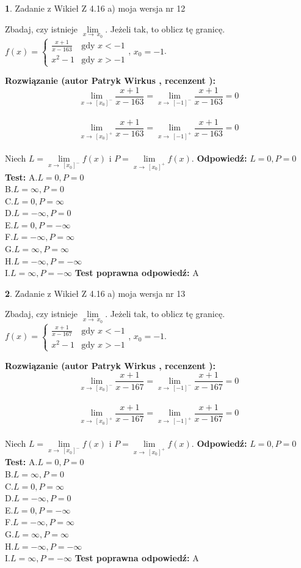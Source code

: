 \documentclass[12pt, a4paper]{article}
\theoremstyle{definition} %
\newtheorem{zad}{}
\newcommand{\zadStart}[1]{\begin{zad}#1\newline}
\newcommand{\zadStop}{\end{zad}}
\newcommand{\rozwStart}[2]{\noindent \textbf{Rozwiązanie (autor #1 , recenzent #2): }\newline}
\newcommand{\rozwStop}{\newline}
\newcommand{\odpStart}{\noindent \textbf{Odpowiedź:}\newline}
\newcommand{\odpStop}{\newline}
\newcommand{\testStart}{\noindent \textbf{Test:}\newline}
\newcommand{\testStop}{\newline}
\newcommand{\kluczStart}{\noindent \textbf{Test poprawna odpowiedź:}\newline}
\newcommand{\kluczStop}{\newline}
\begin{document}
\zadStart{Zadanie z Wikieł Z 4.16 a) moja wersja nr 12}

Zbadaj, czy istnieje $\lim\limits_{x\to\ x_{0}}$. Jeżeli tak, to oblicz tę granicę.\\   $f(x) = \left\{ \begin{array}{ll}
\frac{x+1}{x-163} & \textrm{gdy $x<-1$}\\
x^{2}-1 & \textrm{gdy $x>-1$}
\end{array} \right.$, $x_{0}=-1$.
\zadStop
\rozwStart{Patryk Wirkus}{}
$$\lim\limits_{x\to\ [x_{0}]^{-}}\frac{x+1}{x-163} = \lim\limits_{x\to\ [-1]^{-}}\frac{x+1}{x-163} = 0$$
\\
$$\lim\limits_{x\to\ [x_{0}]^{+}}\frac{x+1}{x-163} = \lim\limits_{x\to\ [-1]^{+}}\frac{x+1}{x-163} = 0$$
\\
Niech $L=\lim\limits_{x\to\ [x_{0}]^{-}}f(x)$ i $P=\lim\limits_{x\to\ [x_{0}]^{+}}f(x)$.
\rozwStop
\odpStart
$L=0, P=0$
\odpStop
\testStart
A.$L=0, P=0$\\ B.$L=\infty, P=0$\\ C.$L=0, P=\infty$\\ D.$L=-\infty, P=0$\\ E.$L=0, P=-\infty$\\
F.$L=-\infty, P=\infty$\\ G.$L=\infty, P=\infty$\\
H.$L=-\infty, P=-\infty$\\
I.$L=\infty, P=-\infty$
\testStop
\kluczStart
A
\kluczStop



\zadStart{Zadanie z Wikieł Z 4.16 a) moja wersja nr 13}

Zbadaj, czy istnieje $\lim\limits_{x\to\ x_{0}}$. Jeżeli tak, to oblicz tę granicę.\\   $f(x) = \left\{ \begin{array}{ll}
\frac{x+1}{x-167} & \textrm{gdy $x<-1$}\\
x^{2}-1 & \textrm{gdy $x>-1$}
\end{array} \right.$, $x_{0}=-1$.
\zadStop
\rozwStart{Patryk Wirkus}{}
$$\lim\limits_{x\to\ [x_{0}]^{-}}\frac{x+1}{x-167} = \lim\limits_{x\to\ [-1]^{-}}\frac{x+1}{x-167} = 0$$
\\
$$\lim\limits_{x\to\ [x_{0}]^{+}}\frac{x+1}{x-167} = \lim\limits_{x\to\ [-1]^{+}}\frac{x+1}{x-167} = 0$$
\\
Niech $L=\lim\limits_{x\to\ [x_{0}]^{-}}f(x)$ i $P=\lim\limits_{x\to\ [x_{0}]^{+}}f(x)$.
\rozwStop
\odpStart
$L=0, P=0$
\odpStop
\testStart
A.$L=0, P=0$\\ B.$L=\infty, P=0$\\ C.$L=0, P=\infty$\\ D.$L=-\infty, P=0$\\ E.$L=0, P=-\infty$\\
F.$L=-\infty, P=\infty$\\ G.$L=\infty, P=\infty$\\
H.$L=-\infty, P=-\infty$\\
I.$L=\infty, P=-\infty$
\testStop
\kluczStart
A
\kluczStop
\end{document}
